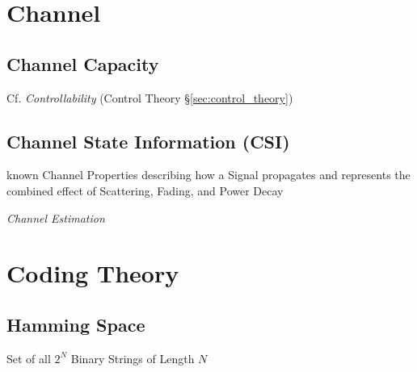 \section{Channel}\label{sec:channel}

\subsection{Channel Capacity}\label{sec:channel_capacity}

\fist Cf. \emph{Controllability} (Control Theory
\S\ref{sec:control_theory})



\subsection{Channel State Information (CSI)}\label{sec:csi}

known Channel Properties describing how a Signal propagates and represents the
combined effect of Scattering, Fading, and Power Decay

\emph{Channel Estimation}



\section{Coding Theory}\label{sec:coding_theory}

\subsection{Hamming Space}\label{sec:hamming_space}

Set of all $2^N$ Binary Strings of Length $N$

